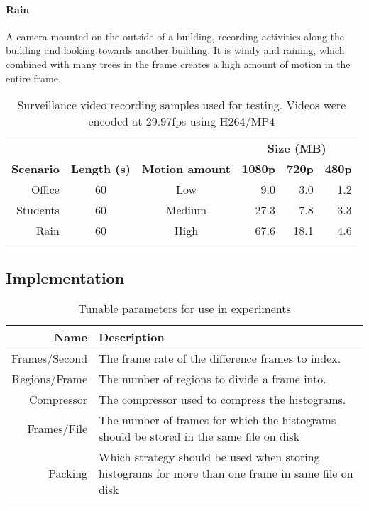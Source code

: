 \paragraph{Rain}
A camera mounted on the outside of a building, recording activities along the building and looking towards another building. It is windy and raining, which combined with many trees in the frame creates a high amount of motion in the entire frame.

\begin{table}[t]
    \caption{Surveillance video recording samples used for testing. Videos were encoded at 29.97fps using H264/MP4}\label{tab:scenarios}
	\centering
    \begin{tabular}{r c c r r r }
	~ & ~ & ~ & \multicolumn{3}{c}{\textbf{Size (MB)}} \\ \cline{4-6}
    \textbf{Scenario}  & \textbf{Length (s)} & \textbf{Motion amount} & \textbf{1080p} & \textbf{720p} & \textbf{480p} \\ \hline\noalign{\smallskip}
    Office   & 60    & Low           & 9.0             & 3.0    	& 1.2        \\
    Students & 60    & Medium        & 27.3            & 7.8    	& 3.3        \\
    Rain     & 60    & High          & 67.6            & 18.1    	& 4.6        \\\noalign{\smallskip}
    \hline
    \end{tabular}
\end{table}

\subsection{Implementation}
\begin{table}[b]
    \caption{Tunable parameters for use in experiments}\label{tab:parameters}
	\centering
    \begin{tabular}{r p{2.5in}}
    \textbf{Name} & \textbf{Description} \\ \hline\noalign{\smallskip}
    Frames/Second   & The frame rate of the difference frames to index. \\
    Regions/Frame   & The number of regions to divide a frame into. \\
    Compressor      & The compressor used to compress the histograms. \\
    Frames/File     & The number of frames for which the histograms should be stored in the same file on disk \\
    Packing         & Which strategy should be used when storing histograms for more than one frame in same file on disk \\\noalign{\smallskip}
    \hline
    \end{tabular}
\end{table}

